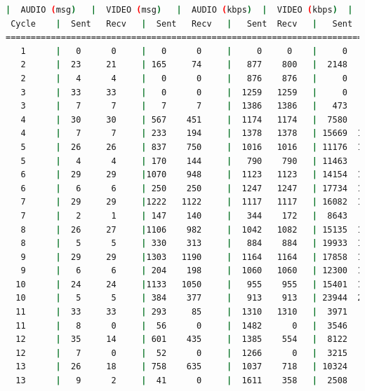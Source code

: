 \begin{lstlisting}[language=bash,basicstyle=\ttfamily\scriptsize]
          |  AUDIO (msg)   |  VIDEO (msg)   |  AUDIO (kbps)  |  VIDEO (kbps)  |   CPU (%)
 Cycle    |  Sent   Recv   |  Sent   Recv   |   Sent  Recv   |   Sent  Recv   | Program System
============================================================================================
   1      |   0      0     |   0      0     |     0     0    |     0     0    |   0      0
   2      |  23     21     | 165     74     |   877    800   |  2148    964   |  47     51
   2      |   4      4     |   0      0     |   876    876   |     0      0   |  20     51
   3      |  33     33     |   0      0     |  1259   1259   |     0      0   |  39     81
   3      |   7      7     |   7      7     |  1386   1386   |   473    473   |  42     82
   4      |  30     30     | 567    451     |  1174   1174   |  7580   6028   |  25     74
   4      |   7      7     | 233    194     |  1378   1378   | 15669  13044   |  36     71
   5      |  26     26     | 837    750     |  1016   1016   | 11176  10015   |  33     67
   5      |   4      4     | 170    144     |   790    790   | 11463   9719   |  42     66
   6      |  29     29     |1070    948     |  1123   1123   | 14154  12538   |  37     67
   6      |   6      6     | 250    250     |  1247   1247   | 17734  17748   |  19     70
   7      |  29     29     |1222   1122     |  1117   1117   | 16082  14765   |  32     70
   7      |   2      1     | 147    140     |   344    172   |  8643   8242   |   5     71
   8      |  26     27     |1106    982     |  1042   1082   | 15135  13436   |  41     70
   8      |   5      5     | 330    313     |   884    884   | 19933  18905   |  32     69
   9      |  29     29     |1303   1190     |  1164   1164   | 17858  16311   |  36     72
   9      |   6      6     | 204    198     |  1060   1060   | 12300  11937   |  53     71
  10      |  24     24     |1133   1050     |   955    955   | 15401  14274   |  32     69
  10      |   5      5     | 384    377     |   913    913   | 23944  23508   |  33     70
  11      |  33     33     | 293     85     |  1310   1310   |  3971   1150   |  33     67
  11      |   8      0     |  56      0     |  1482      0   |  3546      0   |  50     65
  12      |  35     14     | 601    435     |  1385    554   |  8122   5881   |  33     62
  12      |   7      0     |  52      0     |  1266      0   |  3215      0   |  33     62
  13      |  26     18     | 758    635     |  1037    718   | 10324   8649   |  38     65
  13      |   9      2     |  41      0     |  1611    358   |  2508      0   |  21     67

\end{lstlisting}
